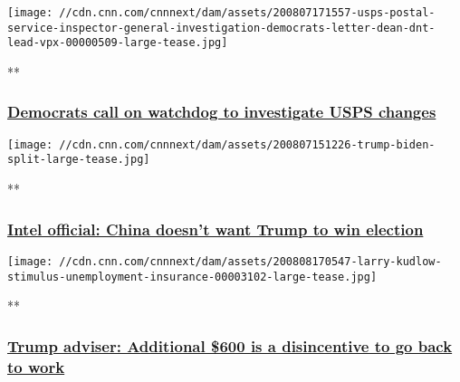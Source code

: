 \href{/videos/politics/2020/08/07/usps-postal-service-inspector-general-investigation-democrats-letter-dean-dnt-lead-vpx.cnn/video/playlists/this-week-in-politics/}{}

\texttt{[image: //cdn.cnn.com/cnnnext/dam/assets/200807171557-usps-postal-service-inspector-general-investigation-democrats-letter-dean-dnt-lead-vpx-00000509-large-tease.jpg]}

**

\hypertarget{democrats-call-on-watchdog-to-investigate-usps-changes}{%
\subsubsection{\texorpdfstring{\href{/videos/politics/2020/08/07/usps-postal-service-inspector-general-investigation-democrats-letter-dean-dnt-lead-vpx.cnn/video/playlists/this-week-in-politics/}{Democrats
call on watchdog to investigate USPS
changes}}{Democrats call on watchdog to investigate USPS changes}}\label{democrats-call-on-watchdog-to-investigate-usps-changes}}

\href{/videos/politics/2020/08/07/2020-election-russia-china-iran-perez-sot-nr-vpx.cnn/video/playlists/this-week-in-politics/}{}

\texttt{[image: //cdn.cnn.com/cnnnext/dam/assets/200807151226-trump-biden-split-large-tease.jpg]}

**

\hypertarget{intel-official-china-doesnt-want-trump-to-win-election}{%
\subsubsection{\texorpdfstring{\href{/videos/politics/2020/08/07/2020-election-russia-china-iran-perez-sot-nr-vpx.cnn/video/playlists/this-week-in-politics/}{Intel
official: China doesn't want Trump to win
election}}{Intel official: China doesn't want Trump to win election}}\label{intel-official-china-doesnt-want-trump-to-win-election}}

\href{/videos/business/2020/08/07/larry-kudlow-stimulus-unemployment-insurance.cnnbusiness/video/playlists/this-week-in-politics/}{}

\texttt{[image: //cdn.cnn.com/cnnnext/dam/assets/200808170547-larry-kudlow-stimulus-unemployment-insurance-00003102-large-tease.jpg]}

**

\hypertarget{trump-adviser-additional-600-is-a-disincentive-to-go-back-to-work}{%
\subsubsection{\texorpdfstring{\href{/videos/business/2020/08/07/larry-kudlow-stimulus-unemployment-insurance.cnnbusiness/video/playlists/this-week-in-politics/}{Trump
adviser: Additional \$600 is a disincentive to go back to
work}}{Trump adviser: Additional \$600 is a disincentive to go back to work}}\label{trump-adviser-additional-600-is-a-disincentive-to-go-back-to-work}}

